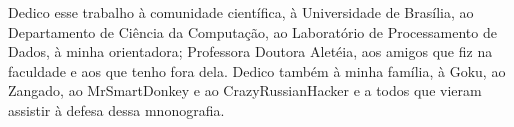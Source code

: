Dedico esse trabalho à comunidade científica, à Universidade de Brasília, ao Departamento de Ciência da Computação, ao Laboratório de Processamento de Dados, à minha orientadora; Professora Doutora Aletéia, aos amigos que fiz na faculdade e aos que tenho fora dela. Dedico também à minha família, à Goku, ao Zangado, ao MrSmartDonkey e ao CrazyRussianHacker e a todos que vieram assistir à defesa dessa mnonografia.